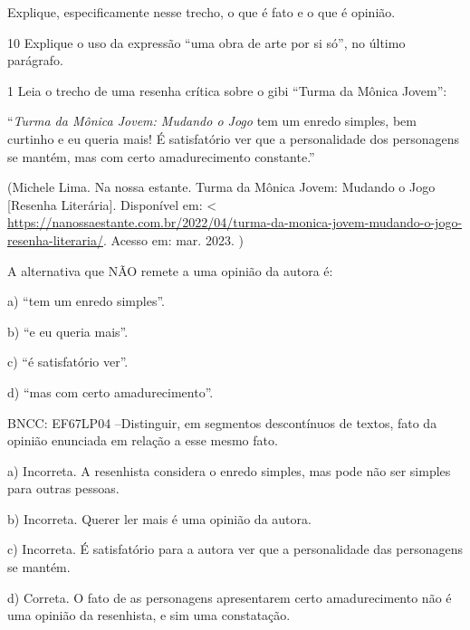 Explique, especificamente nesse trecho, o que é fato e o que é opinião.



\num{10} Explique o uso da expressão ``uma obra de arte por si só'', no
último parágrafo.




\num{1} Leia o trecho de uma resenha crítica sobre o gibi ``Turma da
Mônica Jovem'':

``\emph{Turma da Mônica Jovem: Mudando o Jogo} tem um enredo simples,
bem curtinho e eu queria mais! É satisfatório ver que a personalidade
dos personagens se mantém, mas com certo amadurecimento constante.''

(Michele Lima. Na nossa estante. Turma da Mônica Jovem: Mudando o Jogo
{[}Resenha Literária{]}. Disponível em: \textless{}
\url{https://nanossaestante.com.br/2022/04/turma-da-monica-jovem-mudando-o-jogo-resenha-literaria/}.
Acesso em: mar. 2023. )

A alternativa que NÃO remete a uma opinião da autora é:

a) ``tem um enredo simples''.

b) ``e eu queria mais''.

c) ``é satisfatório ver''.

d) ``mas com certo amadurecimento''.

BNCC: EF67LP04 --Distinguir, em segmentos descontínuos de textos, fato
da opinião enunciada em relação a esse mesmo fato.

a) Incorreta. A resenhista considera o enredo simples, mas pode não ser
simples para outras pessoas.

b) Incorreta. Querer ler mais é uma opinião da autora.

c) Incorreta. É satisfatório para a autora ver que a personalidade das
personagens se mantém.

d) Correta. O fato de as personagens apresentarem certo amadurecimento
não é uma opinião da resenhista, e sim uma constatação.

